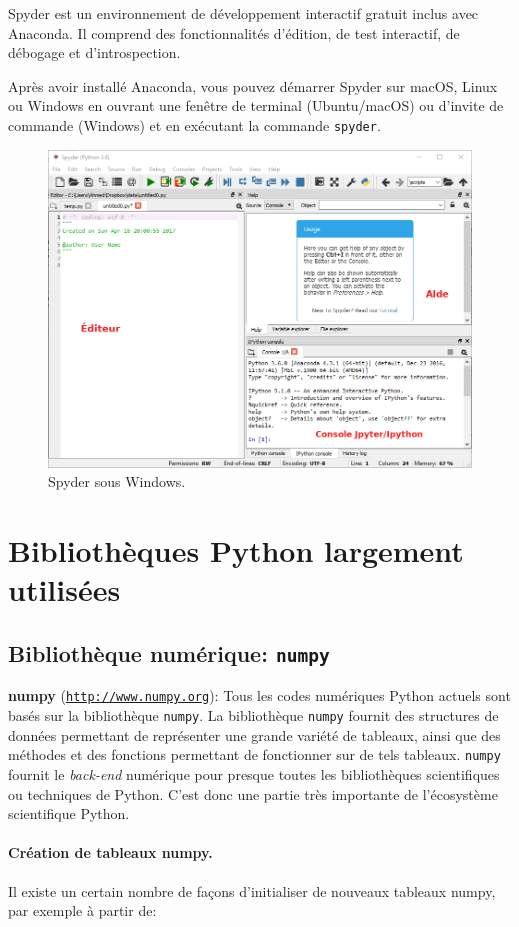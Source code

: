 \documentclass[%
oneside,                 %
final,                   %
10pt,french]{article}
\begin{document}
Spyder est un environnement de développement interactif gratuit inclus avec Anaconda. Il comprend des fonctionnalités d'édition, de test interactif, de débogage et d'introspection.

Après avoir installé Anaconda, vous pouvez démarrer Spyder sur macOS, Linux ou Windows en ouvrant une fenêtre de terminal (Ubuntu/macOS) ou d'invite de commande (Windows) et en exécutant la commande \texttt{spyder}.


\begin{figure}[!ht]  %
  \centerline{\includegraphics[width=0.7\linewidth]{imgs/SpyderIDE.png}}
  \caption{
  Spyder sous Windows.
  }
\end{figure}


\section{Bibliothèques Python largement utilisées}
\subsection{Bibliothèque numérique: \texttt{numpy} }
\textbf{numpy} (\href{{http://www.numpy.org}}{\nolinkurl{http://www.numpy.org}}): Tous les codes numériques Python actuels sont basés sur la bibliothèque \texttt{numpy}. La bibliothèque \texttt{numpy} fournit des structures de données permettant de représenter une grande variété de tableaux, ainsi que des méthodes et des fonctions permettant de fonctionner sur de tels tableaux. \texttt{numpy} fournit le \emph{back-end} numérique pour presque toutes les bibliothèques scientifiques ou techniques de Python. C'est donc une partie très importante de l'écosystème scientifique Python.

\paragraph{Création de tableaux numpy.}
Il existe un certain nombre de façons d’initialiser de nouveaux tableaux numpy, par exemple à partir de:
\end{document}
